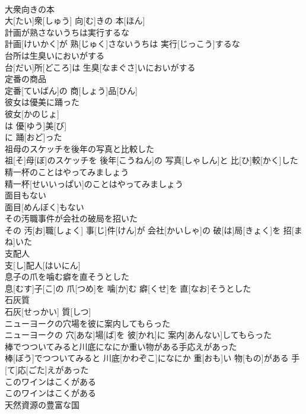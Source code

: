 \documentclass[8pt]{extreport}
\begin{document}
\begin{CJK}{UTF8}{min}
\\	大衆向きの本	
\\	大[たい]衆[しゅう] 向[む]きの 本[ほん]
\\	計画が熟さないうちは実行するな	
\\	計画[けいかく]が 熟[じゅく]さないうちは 実行[じっこう]するな
\\	台所は生臭いにおいがする	
\\	台[だい]所[どころ]は 生臭[なまぐさ]いにおいがする
\\	定番の商品	
\\	定番[ていばん]の 商[しょう]品[ひん]
\\	彼女は優美に踊った	
\\	彼女[かのじょ]
\\	は 優[ゆう]美[び]
\\	に 踊[おど]った 
\\	祖母のスケッチを後年の写真と比較した	
\\	祖[そ]母[ぼ]のスケッチを 後年[こうねん]の 写真[しゃしん]と 比[ひ]較[かく]した
\\	精一杯のことはやってみましょう	
\\	精一杯[せいいっぱい]のことはやってみましょう
\\	面目もない	
\\	面目[めんぼく]もない
\\	その汚職事件が会社の破局を招いた	
\\	その 汚[お]職[しょく] 事[じ]件[けん]が 会社[かいしゃ]の 破[は]局[きょく]を 招[まね]いた
\\	支配人	
\\	支[し]配人[はいにん] 
\\	息子の爪を噛む癖を直そうとした	
\\	息[むす]子[こ]の 爪[つめ]を 噛[か]む 癖[くせ]を 直[なお]そうとした
\\	石灰質	
\\	石灰[せっかい] 質[しつ]
\\	ニューヨークの穴場を彼に案内してもらった	
\\	ニューヨークの 穴[あな]場[ば]を 彼[かれ]に 案内[あんない]してもらった
\\	棒でつついてみると川底になにか重い物がある手応えがあった	
\\	棒[ぼう]でつついてみると 川底[かわぞこ]になにか 重[おも]い 物[もの]がある 手[て]応[ごた]えがあった
\\	このワインはこくがある	
\\	このワインはこくがある
\\	天然資源の豊富な国	

\end{CJK}
\end{document}
